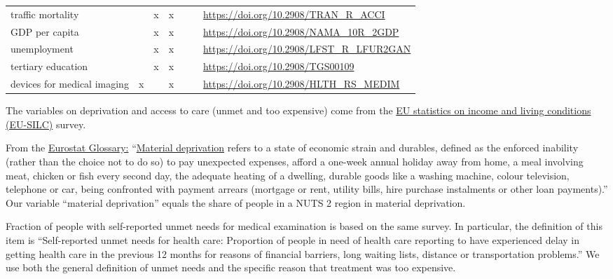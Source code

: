 \documentclass[a4paper,12pt]{article}
\begin{document}
\begin{table}[htbp]
\begin{tabular}{lllllll}
traffic mortality &  & x & x &  &  & \href{https://ec.europa.eu/eurostat/databrowser/view/tran\_r\_acci/default/table?lang=en}{https://doi.org/10.2908/TRAN\_R\_ACCI}\\
GDP per capita &  & x & x &  &  & \href{https://ec.europa.eu/eurostat/databrowser/view/nama\_10r\_2gdp/default/table?lang=en}{https://doi.org/10.2908/NAMA\_10R\_2GDP}\\
unemployment &  & x & x &  &  & \href{https://ec.europa.eu/eurostat/databrowser/view/lfst\_r\_lfur2gan/default/table}{https://doi.org/10.2908/LFST\_R\_LFUR2GAN}\\
tertiary education &  & x & x &  &  & \href{https://ec.europa.eu/eurostat/databrowser/view/tgs00109/default/table?lang=en\&category=t\_reg.t\_reg\_educ}{https://doi.org/10.2908/TGS00109}\\
devices for medical imaging & x &  & x &  &  & \href{https://ec.europa.eu/eurostat/databrowser/view/hlth\_rs\_medim/default/table?lang=en}{https://doi.org/10.2908/HLTH\_RS\_MEDIM}\\
\end{tabular}
\end{table}



The variables on deprivation and access to care (unmet and too expensive) come from the \href{https://ec.europa.eu/eurostat/statistics-explained/index.php?title=EU\_statistics\_on\_income\_and\_living\_conditions\_(EU-SILC)\_methodology}{EU statistics on income and living conditions (EU-SILC)} survey.

From the \href{https://ec.europa.eu/eurostat/statistics-explained/index.php?title=Glossary:At-risk-of-poverty\_rate}{Eurostat Glossary:} ``\href{https://ec.europa.eu/eurostat/statistics-explained/index.php?title=Glossary:Material\_deprivation}{Material deprivation} refers to a state of economic strain and durables, defined as the enforced inability (rather than the choice not to do so) to pay unexpected expenses, afford a one-week annual holiday away from home, a meal involving meat, chicken or fish every second day, the adequate heating of a dwelling, durable goods like a washing machine, colour television, telephone or car, being confronted with payment arrears (mortgage or rent, utility bills, hire purchase instalments or other loan payments).'' Our variable ``material deprivation'' equals the share of people in a NUTS 2 region in material deprivation.

Fraction of people with self-reported unmet needs for medical examination is based on the same survey. In particular, the definition of this item is ``Self-reported unmet needs for health care: Proportion of people in need of health care reporting to have experienced delay in getting health care in the previous 12 months for reasons of financial barriers, long waiting lists, distance or transportation problems.'' We use both the general definition of unmet needs and the specific reason that treatment was too expensive.
\end{document}
